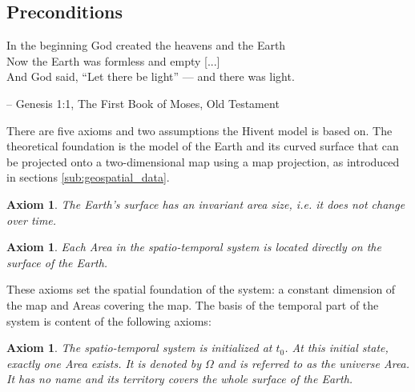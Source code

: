 

\subsection{Preconditions} %
\label{sub:preconditions}

\begin{quoteit}
  In the beginning God created the heavens and the Earth \\
  Now the Earth was formless and empty [...] \\
  And God said, “Let there be light” --- and there was light.
\end{quoteit}
\hfill -- Genesis 1:1, The First Book of Moses, Old Testament
\vspace{1em}


There are five axioms and two assumptions the Hivent model is based on. The theoretical foundation is the model of the Earth and its curved surface that can be projected onto a two-dimensional map using a map projection, as introduced in sections \ref{sub:geospatial_data}.

\newtheorem{invariant_surface}[assicounter]{Axiom}
\begin{invariant_surface}
\label{axm:invariant_surface}
  The Earth's surface has an invariant area size, i.e. it does not change over time.
\end{invariant_surface}

\vspace{-2.0em}
\newtheorem{area_on_surface}[assicounter]{Axiom}
\begin{area_on_surface}
\label{axm:area_on_surface}
  Each Area in the spatio-temporal system is located directly on the surface of the Earth.
\end{area_on_surface}

These axioms set the spatial foundation of the system: a constant dimension of the map and Areas covering the map. The basis of the temporal part of the system is content of the following axioms:

\vspace{-1.0em}
\newtheorem{initial_configuration}[assicounter]{Axiom}
\begin{initial_configuration}
\label{axm:initial_configuration}
  The spatio-temporal system is initialized at $t_0$. At this initial state, exactly one Area exists. It is denoted by $\Omega$ and is referred to as the \emph{universe} Area. It has no name and its territory covers the whole surface of the Earth.
\end{initial_configuration}

